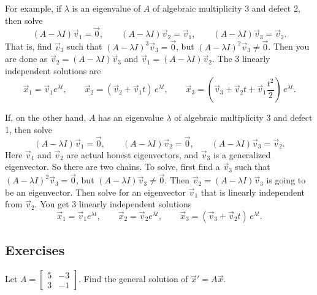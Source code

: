 For example, if $\lambda$ is an eigenvalue of $A$
of algebraic multiplicity 3 and defect 2, then solve
\begin{equation*}
(A - \lambda I) \vec{v}_1 = \vec{0} , \qquad
(A - \lambda I) \vec{v}_2 = \vec{v}_1 , \qquad
(A - \lambda I) \vec{v}_3 = \vec{v}_2 .
\end{equation*}
That is, find $\vec{v}_3$ such that 
${(A - \lambda I)}^3 \vec{v}_3 = \vec{0}$, but
${(A - \lambda I)}^2 \vec{v}_3 \neq \vec{0}$.
Then you are done as
$\vec{v}_2 = (A - \lambda I) \vec{v}_3$
and 
$\vec{v}_1 = (A - \lambda I) \vec{v}_2$.
The 3 linearly independent solutions are
\begin{equation*}
\vec{x}_1 = \vec{v}_1 e^{\lambda t} , \qquad
\vec{x}_2 = ( \vec{v}_2 + \vec{v}_1 t ) \, e^{\lambda t} , \qquad
\vec{x}_3 = \left( \vec{v}_3 + \vec{v}_2 t +
\vec{v}_{1} \frac{t^2}{2} \right) \, e^{\lambda t} .
\end{equation*}

If, on the other hand, $A$ has an eigenvalue $\lambda$
of algebraic multiplicity 3 and defect 1, then 
solve
\begin{equation*}
(A - \lambda I) \vec{v}_1 = \vec{0} , \qquad
(A - \lambda I) \vec{v}_2 = \vec{0} , \qquad
(A - \lambda I) \vec{v}_3 = \vec{v}_2 .
\end{equation*}
Here $\vec{v}_1$ and $\vec{v}_2$ are actual honest eigenvectors,
and $\vec{v}_3$ is a generalized eigenvector.
So there are two chains.
To solve, first find a 
$\vec{v}_3$ such that 
${(A - \lambda I)}^2 \vec{v}_3 = \vec{0}$, but
$(A - \lambda I) \vec{v}_3 \neq \vec{0}$.
Then $\vec{v}_2 = (A - \lambda I) \vec{v}_3$ is going to be an eigenvector.
Then solve for an eigenvector $\vec{v}_1$ that is linearly independent 
from $\vec{v}_2$.
You get 3 linearly independent solutions
\begin{equation*}
\vec{x}_1 = \vec{v}_1 e^{\lambda t} , \qquad
\vec{x}_2 = \vec{v}_2 e^{\lambda t} , \qquad
\vec{x}_3 = ( \vec{v}_3 + \vec{v}_2 t ) \, e^{\lambda t} .
\end{equation*}

\subsection{Exercises}

\begin{exercise}
Let
$A = \left[ \begin{smallmatrix} 5 & -3 \\ 3 & -1 \end{smallmatrix} \right]$.
Find the general solution of ${\vec{x}}' = A \vec{x}$.
\end{exercise}

